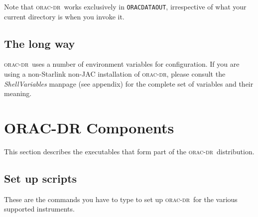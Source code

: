\documentclass[twoside,11pt]{article}
\renewcommand{\_}{\texttt{\symbol{95}}}
\newcommand{\oracdr}{\textsc{orac-dr}}
\begin{document}
Note that \oracdr\ works exclusively in \texttt{ORAC\_DATA\_OUT}, irrespective of
what your current directory is when you invoke it.

\subsection*{The long way\label{Setting_up_to_run_oracdr_The_long_way}}

\oracdr\ uses a number of environment variables for configuration. If
you are using a non-Starlink non-JAC installation of \oracdr, please
consult the \emph{ShellVariables} manpage (see appendix) for the complete set of
variables and their meaning.

\section{ORAC-DR Components\label{ORAC-DR_Components}}

This section describes the executables that form part of the \oracdr\
distribution.

\subsection*{Set up scripts\label{ORAC-DR_Components_Set_up_scripts}}

These are the commands you have to type to set up \oracdr\ for the various
supported instruments.
\end{document}
